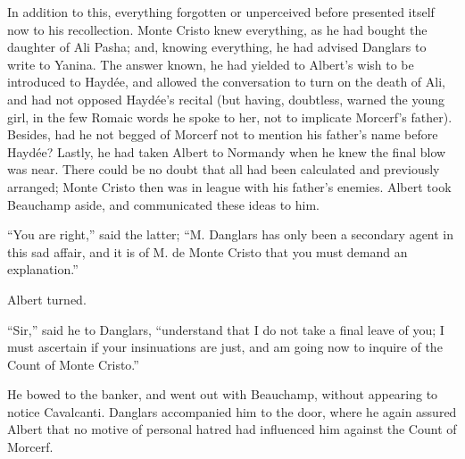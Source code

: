 In addition to this, everything forgotten or unperceived before
presented itself now to his recollection. Monte Cristo knew everything,
as he had bought the daughter of Ali Pasha; and, knowing everything, he
had advised Danglars to write to Yanina. The answer known, he had
yielded to Albert’s wish to be introduced to Haydée, and allowed the
conversation to turn on the death of Ali, and had not opposed Haydée’s
recital (but having, doubtless, warned the young girl, in the few
Romaic words he spoke to her, not to implicate Morcerf’s father).
Besides, had he not begged of Morcerf not to mention his father’s name
before Haydée? Lastly, he had taken Albert to Normandy when he knew the
final blow was near. There could be no doubt that all had been
calculated and previously arranged; Monte Cristo then was in league
with his father’s enemies. Albert took Beauchamp aside, and
communicated these ideas to him.

“You are right,” said the latter; “M. Danglars has only been a
secondary agent in this sad affair, and it is of M. de Monte Cristo
that you must demand an explanation.”

Albert turned.

“Sir,” said he to Danglars, “understand that I do not take a final
leave of you; I must ascertain if your insinuations are just, and am
going now to inquire of the Count of Monte Cristo.”

He bowed to the banker, and went out with Beauchamp, without appearing
to notice Cavalcanti. Danglars accompanied him to the door, where he
again assured Albert that no motive of personal hatred had influenced
him against the Count of Morcerf.
